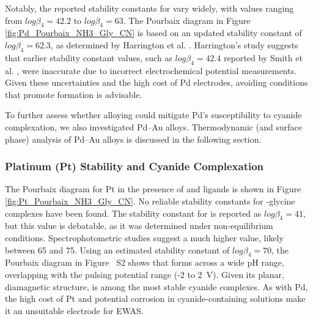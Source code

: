 \documentclass[journal=jacsat,manuscript=article]{achemso}
\begin{document}
Notably, the reported stability constants for \ce{[Pd(CN)4^2+]} vary widely, with values ranging from $log\beta_4 = 42.2$\cite{Smith1989CriticalConstants} to $log\beta_4 = 63$\cite{Cabbiness1969MacrocyclicComplexes}. The Pourbaix diagram in Figure \ref{fig:Pd_Pourbaix_NH3_Gly_CN} is based on an updated stability constant of $log\beta_4 = 62.3$, as determined by Harrington et al. \cite{Harrington2005DeterminationIon}. Harrington’s study suggests that earlier stability constant values, such as $log\beta_4 = 42.4$ reported by Smith et al. \cite{Smith1989CriticalConstants}, were inaccurate due to incorrect electrochemical potential measurements. Given these uncertainties and the high cost of Pd electrodes, avoiding conditions that promote \ce{[Pd(CN)4^2+]} formation is advisable.

To further assess whether alloying could mitigate Pd’s susceptibility to cyanide complexation, we also investigated Pd–Au alloys. Thermodynamic (and surface phase) analysis of Pd–Au alloys is discussed in the following section.


\subsubsection{Platinum (Pt) Stability and Cyanide Complexation} 
The Pourbaix diagram for Pt in the presence of  and  ligands is shown in Figure \ref{fig:Pt_Pourbaix_NH3_Gly_CN}. No reliable stability constants for -glycine complexes have been found\cite{Kiss1991CriticalGlycine}. The stability constant for \ce{[Pt(CN)4^2+]} is reported as $log\beta_4 = 41 $\cite{Smith1989CriticalConstants}, but this value is debatable, as it was determined under non-equilibrium conditions\cite{Hancock1976FormationTetrakiscyanopalladate2-}. Spectrophotometric studies suggest a much higher value, likely between 65 and 75. Using an estimated stability constant of $log\beta_4 = 70$, the Pourbaix diagram in Figure ~S2 shows that \ce{[Pt(CN)4^2+]} forms across a wide pH range, overlapping with the pulsing potential range (-2 to 2~V). Given its planar, diamagnetic structure, \ce{[Pt(CN)4^2+]} is among the most stable cyanide complexes\cite{Griffith1962CyanideMetals}. As with Pd, the high cost of Pt and potential corrosion in cyanide-containing solutions make it an unsuitable electrode for EWAS.
\end{document}
